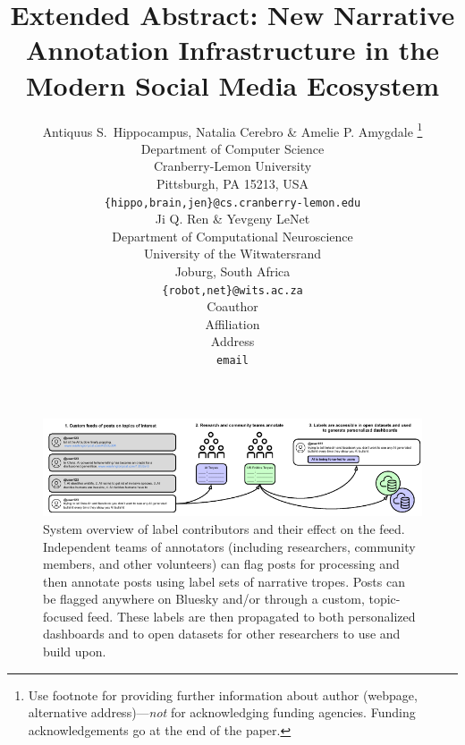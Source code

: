 \documentclass{article} %
\title{Extended Abstract: New Narrative Annotation Infrastructure in the Modern Social Media Ecosystem}
\author{Antiquus S.~Hippocampus, Natalia Cerebro \& Amelie P. Amygdale \thanks{ Use footnote for providing further information
about author (webpage, alternative address)---\emph{not} for acknowledging
funding agencies.  Funding acknowledgements go at the end of the paper.} \\
Department of Computer Science\\
Cranberry-Lemon University\\
Pittsburgh, PA 15213, USA \\
\texttt{\{hippo,brain,jen\}@cs.cranberry-lemon.edu} \\
\And
Ji Q. Ren \& Yevgeny LeNet \\
Department of Computational Neuroscience \\
University of the Witwatersrand \\
Joburg, South Africa \\
\texttt{\{robot,net\}@wits.ac.za} \\
\AND
Coauthor \\
Affiliation \\
Address \\
\texttt{email}
}
\begin{document}
\ifcolmsubmission
\linenumbers
\fi

\maketitle




\begin{figure}[h]
    \centering
    \includegraphics[width=\textwidth]{images/gnif_figure_bluesky.pdf}
     \caption{System overview of label contributors and their effect on the feed. Independent teams of annotators (including researchers, community members, and other volunteers) can flag posts for processing and then annotate posts using label sets of narrative tropes. Posts can be flagged anywhere on Bluesky and/or through a custom, topic-focused feed. These labels are then propagated to both personalized dashboards and to open datasets for other researchers to use and build upon.}
    \label{figure:system-overview}
\end{figure}


\end{document}
